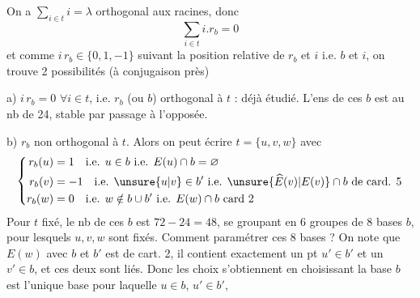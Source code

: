 On a $\sum_{i\in t}i=\lambda$ orthogonal aux racines, donc
\[
\sum_{i\in t}i.r_b=0
\]
et comme $i\,r_b\in\{0,1,-1\}$ suivant la position relative de $r_b$ et $i$ i.e.  $b$ et $i$, on trouve 2 possibilités (à conjugaison près)

a) $i\,r_b=0$ $\forall i\in t$, i.e.  $r_b$ (ou $b$) orthogonal à $t$ : déjà étudié. L'ens de ces $b$ est au nb de 24, stable par passage à l'opposée.

b) \deleted{\unsure{\#|$\exists$}} $r_b$ non orthogonal à $t$. Alors on peut écrire $t=\{u,v,w\}$ avec
\[
\left\{\begin{aligned}
r_b(u)&=1\quad\text{i.e. }u\in b\ \text{i.e. }E(u)\cap b=\varnothing\\
r_b(v)&=-1\quad\text{i.e. }\unsure{u|v}\in b'\ \text{i.e. }\unsure{\widehat E(v)|E(v)}\cap b\ \text{de card. }5\\
r_b(w)&=0\quad\text{i.e. }w\notin b\cup b'\ \text{i.e. }E(w)\cap b\ \text{card }2
\end{aligned}\right.
\]
Pour $t$ fixé, le nb de ces $b$ est $72-24=48$, se groupant en 6 groupes de 8 bases $b$, pour lesquels $u,v,w$ sont fixés. Comment paramétrer ces 8 bases ? On note que  $E(w)$ avec $b$ et $b'$ est de cart. 2, il contient exactement un pt $u'\in b'$ et un $v'\in b$, et ces deux sont liés. Donc les  choix s'obtiennent en choisissant  la base $b$ est l'unique base  pour laquelle $u\in b$, $u'\in b'$,

